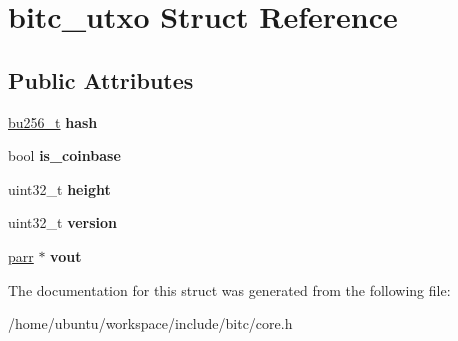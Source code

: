 \hypertarget{structbitc__utxo}{\section{bitc\-\_\-utxo Struct Reference}
\label{structbitc__utxo}
}
\subsection*{Public Attributes}
\begin{DoxyCompactItemize}
\item 
\hypertarget{structbitc__utxo_af06e5a779c32844ed50fb38336607bac}{\hyperlink{structbu256}{bu256\-\_\-t} {\bfseries hash}}\label{structbitc__utxo_af06e5a779c32844ed50fb38336607bac}

\item 
\hypertarget{structbitc__utxo_a035c29f46773ce977e58d0ed14b09a10}{bool {\bfseries is\-\_\-coinbase}}\label{structbitc__utxo_a035c29f46773ce977e58d0ed14b09a10}

\item 
\hypertarget{structbitc__utxo_ad6838ebd4e0e4584b8bef6e18c27c8f0}{uint32\-\_\-t {\bfseries height}}\label{structbitc__utxo_ad6838ebd4e0e4584b8bef6e18c27c8f0}

\item 
\hypertarget{structbitc__utxo_a7a685f765e49f890b4b148b78b85af0c}{uint32\-\_\-t {\bfseries version}}\label{structbitc__utxo_a7a685f765e49f890b4b148b78b85af0c}

\item 
\hypertarget{structbitc__utxo_a66c000ee2e620564a3578cdeead0089b}{\hyperlink{structparr}{parr} $\ast$ {\bfseries vout}}\label{structbitc__utxo_a66c000ee2e620564a3578cdeead0089b}

\end{DoxyCompactItemize}


The documentation for this struct was generated from the following file\-:\begin{DoxyCompactItemize}
\item 
/home/ubuntu/workspace/include/bitc/core.\-h\end{DoxyCompactItemize}
